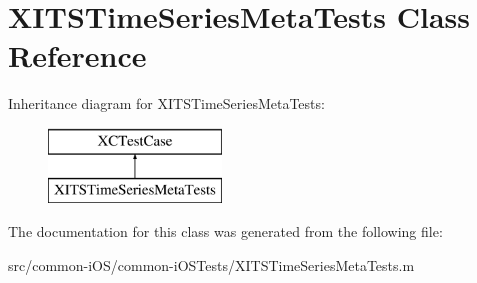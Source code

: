 \hypertarget{interface_x_i_t_s_time_series_meta_tests}{}\section{X\+I\+T\+S\+Time\+Series\+Meta\+Tests Class Reference}
\label{interface_x_i_t_s_time_series_meta_tests}
Inheritance diagram for X\+I\+T\+S\+Time\+Series\+Meta\+Tests\+:\begin{figure}[H]
\begin{center}
\leavevmode
\includegraphics[height=2.000000cm]{interface_x_i_t_s_time_series_meta_tests}
\end{center}
\end{figure}


The documentation for this class was generated from the following file\+:\begin{DoxyCompactItemize}
\item 
src/common-\/i\+O\+S/common-\/i\+O\+S\+Tests/X\+I\+T\+S\+Time\+Series\+Meta\+Tests.\+m\end{DoxyCompactItemize}
